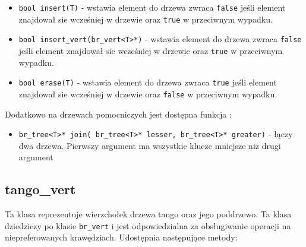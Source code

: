 \documentclass[declaration,shortabstract]{iithesis}
\theoremstyle{thm}
\theoremstyle{remark}
\theoremstyle{plain}
\theoremstyle{plain}
\theoremstyle{plain}
\begin{document}
\begin{itemize}
\item{\texttt{bool insert(T)} - wstawia element do drzewa zwraca \texttt{false} jeśli element znajdował sie wcześniej w drzewie oraz \texttt{true} w przeciwnym wypadku.}
\item{\texttt{bool insert\_vert(br\_vert<T>*)} - wstawia element do drzewa zwraca \texttt{false} jeśli element znajdował sie wcześniej w drzewie oraz \texttt{true} w przeciwnym wypadku.}
\item{\texttt{bool erase(T)} - wstawia element do drzewa zwraca \texttt{true} jeśli element znajdował sie wcześniej w drzewie oraz \texttt{false} w przeciwnym wypadku.}

\end{itemize}

Dodatkowo na drzewach pomocniczych jest dostępna funkcja : 

\begin{itemize}
\item{\texttt{br\_tree<T>* join( br\_tree<T>* lesser, br\_tree<T>* greater)} - łączy dwa drzewa. Pierwszy argument ma wszystkie klucze mniejsze niż drugi argument}

\end{itemize}



\subsection{tango\_vert}

Ta klasa reprezentuje wierzchołek drzewa tango oraz jego poddrzewo. Ta klasa dziedziczy po klasie \texttt{br\_vert} i jest odpowiedzialna za obsługiwanie operacji na niepreferowanych krawędziach. Udostępnia następujące metody: 
\end{document}
